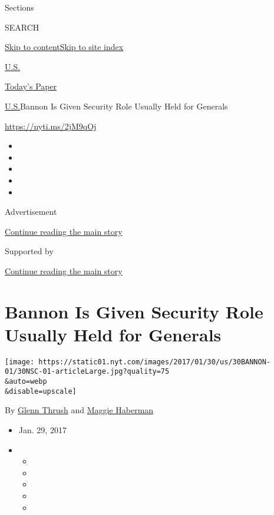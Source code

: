 Sections

SEARCH

\protect\hyperlink{site-content}{Skip to
content}\protect\hyperlink{site-index}{Skip to site index}

\href{https://www.nytimes.com/section/us}{U.S.}

\href{https://myaccount.nytimes.com/auth/login?response_type=cookie\&client_id=vi}{}

\href{https://www.nytimes.com/section/todayspaper}{Today's Paper}

\href{/section/us}{U.S.}\textbar{}Bannon Is Given Security Role Usually
Held for Generals

\url{https://nyti.ms/2jM9qOj}

\begin{itemize}
\item
\item
\item
\item
\item
\end{itemize}

Advertisement

\protect\hyperlink{after-top}{Continue reading the main story}

Supported by

\protect\hyperlink{after-sponsor}{Continue reading the main story}

\hypertarget{bannon-is-given-security-role-usually-held-for-generals}{%
\section{Bannon Is Given Security Role Usually Held for
Generals}\label{bannon-is-given-security-role-usually-held-for-generals}}

\texttt{[image: https://static01.nyt.com/images/2017/01/30/us/30BANNON-01/30NSC-01-articleLarge.jpg?quality=75\\\&auto=webp\\\&disable=upscale]}

By \href{https://www.nytimes.com/by/glenn-thrush}{Glenn Thrush} and
\href{http://www.nytimes.com/by/maggie-haberman}{Maggie Haberman}

\begin{itemize}
\item
  Jan. 29, 2017
\item
  \begin{itemize}
  \item
  \item
  \item
  \item
  \item
  \end{itemize}
\end{itemize}

